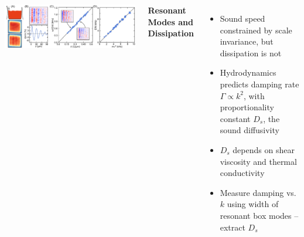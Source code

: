 \documentclass[26pt, paperwidth=36in,paperheight=48in]{tikzposter} %
\newcommand{\myfont}{\fontsize{24}{30}\selectfont}
\begin{document}
\begin{columns}
{\begin{minipage}{0.3\textwidth}
		\vspace{1.5cm}
		\hspace{-1cm}
		\includegraphics[width=\textwidth,
		trim=6.2cm 0cm 0cm 0cm,clip]{figures/sound_diff_disp.pdf}
		
	\end{minipage}

	\vspace{1.4cm}
	\begin{minipage}{0.2\textwidth}
		\flushleft
		\textbf{Resonant Modes and Dissipation}
		\vspace{1cm}
		\myfont
		\begin{minipage}{0.63\textwidth}
			\vspace{1.2cm}
			\begin{itemize}
				\item Sound speed constrained by scale invariance, but dissipation is not
				
				\item Hydrodynamics predicts damping rate $\Gamma \propto k^2$, with proportionality constant $D_s$, the sound diffusivity
				
				\item $D_s$ depends on shear viscosity and thermal conductivity 
				
				\item Measure damping vs. $k$ using width of resonant box modes -- extract $D_s$
			\end{itemize}
		\end{minipage}
		

\end{minipage}}
\end{columns}
\end{document}
